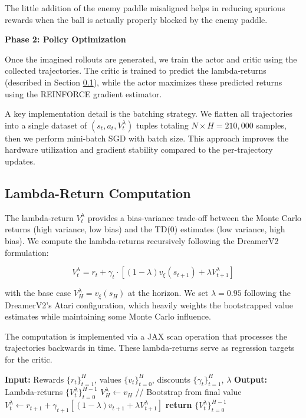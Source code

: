 \documentclass[
	english,
	ruledheaders=section,
	class=report,
	thesis={type=master},
	accentcolor=9c,
	custommargins=true,
	marginpar=false,
	parskip=half-,
	fontsize=11pt,
	pdfa=true,
]{tudapub}
\begin{document}
The little addition of the enemy paddle misaligned helps in reducing spurious
rewards when the ball is actually properly blocked by the enemy paddle.

\textbf{Phase 2: Policy Optimization}

Once the imagined rollouts are generated, we train the actor and critic using
the collected trajectories. The critic is trained to predict the lambda-returns
(described in Section \ref{subsec:lambda_returns}), while the actor maximizes
these predicted returns using the REINFORCE gradient estimator.

A key implementation detail is the batching strategy. We flatten all
trajectories into a single dataset of $(s_t, a_t, V^\lambda_t)$ tuples totaling
$N \times H = 210,000$ samples, then we perform mini-batch SGD with batch size. This approach improves the hardware utilization and gradient stability
compared to the per-trajectory updates.

\subsection{Lambda-Return Computation}
\label{subsec:lambda_returns}

The lambda-return $V^\lambda_t$ provides a bias-variance trade-off between the
Monte Carlo returns (high variance, low bias) and the TD(0) estimates (low
variance, high bias). We compute the lambda-returns recursively following the
DreamerV2 formulation:

\begin{equation}
	V^\lambda_t = r_t + \gamma_t \cdot \left[(1 - \lambda) v_\xi(s_{t+1}) + \lambda V^\lambda_{t+1}\right]
	\label{eq:lambda_return}
\end{equation}

with the base case $V^\lambda_H = v_\xi(s_H)$ at the horizon. We set $\lambda =
	0.95$ following the DreamerV2's Atari configuration, which heavily weights the
bootstrapped value estimates while maintaining some Monte Carlo influence.

The computation is implemented via a JAX scan operation that processes the
trajectories backwards in time. These lambda-returns serve as regression targets for the critic.

\begin{algorithm}
	\caption{Lambda-Return Computation (Backward Pass)}
	\begin{algorithmic}[1]
		\STATE \textbf{Input:} Rewards $\{r_t\}_{t=1}^{H}$, values $\{v_t\}_{t=0}^{H}$, discounts $\{\gamma_t\}_{t=1}^{H}$, $\lambda$
		\STATE \textbf{Output:} Lambda-returns $\{V^\lambda_t\}_{t=0}^{H-1}$
		\STATE $V^\lambda_H \gets v_H$ \hfill // Bootstrap from final value
		\STATE $V^\lambda_t \gets r_{t+1} + \gamma_{t+1} \left[(1-\lambda) v_{t+1} + \lambda V^\lambda_{t+1}\right]$
		\ENDFOR
		\STATE \textbf{return} $\{V^\lambda_t\}_{t=0}^{H-1}$
	\end{algorithmic}
\end{algorithm}
\end{document}
